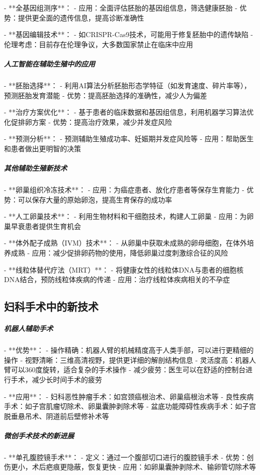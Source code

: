 \begin{enumerate}
- **全基因组测序**：
  - 应用：全面评估胚胎的基因组信息，筛选健康胚胎
  - 优势：提供更全面的遗传信息，提高诊断准确性

- **基因编辑技术**：
  - 如CRISPR-Cas9技术，可能用于修复胚胎中的遗传缺陷
  - 伦理考虑：目前存在伦理争议，大多数国家禁止在临床中应用

\subparagraph{人工智能在辅助生殖中的应用}

- **胚胎选择**：
  - 利用AI算法分析胚胎形态学特征（如发育速度、碎片率等），预测胚胎发育潜能
  - 优势：提高胚胎选择的准确性，减少人为偏差

- **治疗方案优化**：
  - 基于患者的临床数据和基因组信息，利用机器学习算法优化促排卵方案
  - 优势：提高治疗效果，减少并发症风险

- **预测分析**：
  - 预测辅助生殖成功率、妊娠期并发症风险等
  - 应用：帮助医生和患者做出更明智的决策

\subparagraph{其他辅助生殖新技术}

- **卵巢组织冷冻技术**：
  - 应用：为癌症患者、放化疗患者等保存生育能力
  - 优势：可以保存大量的原始卵泡，提高生育保存的成功率

- **人工卵巢技术**：
  - 利用生物材料和干细胞技术，构建人工卵巢
  - 应用：为卵巢早衰患者提供生育机会

- **体外配子成熟（IVM）技术**：
  - 从卵巢中获取未成熟的卵母细胞，在体外培养成熟
  - 应用：减少促排卵药物的使用，降低卵巢过度刺激综合征的风险

- **线粒体替代疗法（MRT）**：
  - 将健康女性的线粒体DNA与患者的细胞核DNA结合，预防线粒体疾病的传递
  - 应用：治疗线粒体疾病相关的不孕症

\subsection{妇科手术中的新技术}

\subparagraph{机器人辅助手术}

- **优势**：
  - 操作精确：机器人臂的机械精度高于人类手部，可以进行更精细的操作
  - 视野清晰：三维高清视野，提供更详细的解剖结构信息
  - 灵活度高：机器人臂可以360度旋转，适合复杂的手术操作
  - 减少疲劳：医生可以在舒适的控制台进行手术，减少长时间手术的疲劳

- **应用**：
  - 妇科恶性肿瘤手术：如宫颈癌根治术、卵巢癌根治术等
  - 良性疾病手术：如子宫肌瘤切除术、卵巢囊肿剥除术等
  - 盆底功能障碍性疾病手术：如子宫脱垂悬吊术、阴道前后壁修补术等

\subparagraph{微创手术技术的新进展}

- **单孔腹腔镜手术**：
  - 定义：通过一个腹部切口进行的腹腔镜手术
  - 优势：创伤更小，术后疤痕更隐蔽，恢复更快
  - 应用：如卵巢囊肿剥除术、输卵管切除术等


\end{enumerate}
